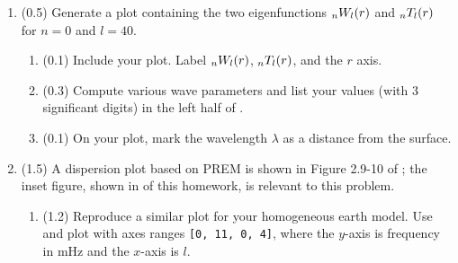 \documentclass[11pt,titlepage,fleqn]{article}
\begin{document}
\begin{enumerate}
\begin{enumerate}
\item (0.1) List the predicted eigenperiods (not eigenfrequencies) in  or in your notebook.

\item (0.1) Among the toroidal modes in , the gravest mode is  ($n=0$, $l=2$).
%
\begin{itemize}
\item List the eigenfrequency $_0f_2$ in mHz and eigenperiod $_0T_2$ in seconds and minutes. (Note \footnote{Notation might be confusing: $T$ is period, $T(r)$ is the stress eigenfunction (for toroidal modes), and  is the label for a toroidal mode. Usually it should be clear from the context.})

\item Compare with the observed value in . What is the percent difference, $100\,\ln(T/T_{\rm obs})$, where $T$ is your computed eigenperiod for ?
\end{itemize}

\end{enumerate}

\label{prob:l29}


\item (0.5) Generate a plot containing the two eigenfunctions $\mbox{${}_nW_l$}(r)$ and $\mbox{${}_nT_l$}(r)$ for $n=0$ and $l=40$.
%
\begin{enumerate}
\item (0.1) Include your plot. Label $\mbox{${}_nW_l$}(r)$, $\mbox{${}_nT_l$}(r)$, and the $r$ axis.
\item (0.3) Compute various wave parameters and list your values (with 3 significant digits) in the left half of .
\item (0.1) On your plot, mark the wavelength $\lambda$ as a distance from the surface.
\end{enumerate}

\label{prob:0T40_homo}


\item (1.5) A dispersion plot based on PREM is shown in Figure 2.9-10 of \citet{SteinWysession}; the inset figure, shown in  of this homework, is relevant to this problem. 
%
\begin{enumerate}
\item (1.2) Reproduce a similar plot for your homogeneous earth model. Use  and plot with axes ranges \verb+[0, 11, 0, 4]+, where the $y$-axis is frequency in mHz and the $x$-axis is $l$.


\end{enumerate}
\end{enumerate}
\end{document}
